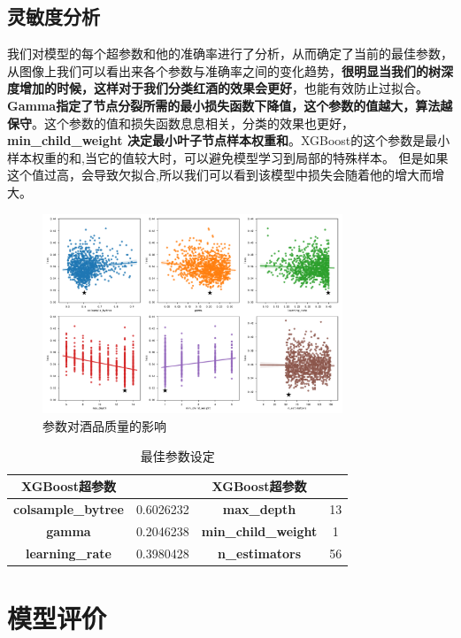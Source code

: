 \documentclass{whutmod}
\begin{document}
\subsection{灵敏度分析}
我们对模型的每个超参数和他的准确率进行了分析，从而确定了当前的最佳参数，从图像上我们可以看出来各个参数与准确率之间的变化趋势，\textbf{很明显当我们的树深度增加的时候，这样对于我们分类红酒的效果会更好}，也能有效防止过拟合。\textbf{Gamma指定了节点分裂所需的最小损失函数下降值，这个参数的值越大，算法越保守}。这个参数的值和损失函数息息相关，分类的效果也更好，\textbf{min\_child\_weight 决定最小叶子节点样本权重和}。XGBoost的这个参数是最小样本权重的和,当它的值较大时，可以避免模型学习到局部的特殊样本。 但是如果这个值过高，会导致欠拟合,所以我们可以看到该模型中损失会随着他的增大而增大。
\begin{figure}[!h]
	\centering
	\includegraphics[width=0.8\textwidth]{_trials.pdf}
	\caption{参数对酒品质量的影响}
\end{figure}
\begin{table}[!htbp]
	\centering
	\caption{最佳参数设定}
	\begin{tabular}{cccc}
		\toprule
		\multicolumn{1}{c}{\textbf{XGBoost超参数}} & &\multicolumn{1}{c}{\textbf{XGBoost超参数}}&\\
		\midrule
		\textbf{colsample\_bytree} & 0.6026232 & \textbf{max\_depth} & 13 \\
		\textbf{gamma} & 0.2046238 &\textbf{min\_child\_weight} & 1 \\
		\textbf{learning\_rate} & 0.3980428 &\textbf{n\_estimators} & 56 \\
		\bottomrule
	\end{tabular}%
\end{table}%
\section{模型评价}
\end{document}
